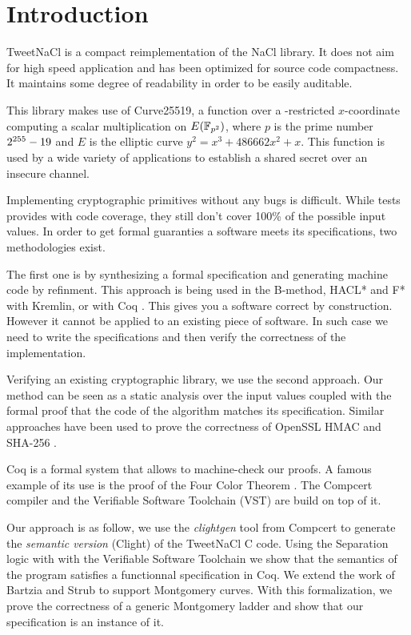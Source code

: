 \section{Introduction}

TweetNaCl\cite{BGJ+15} is a compact reimplementation of the
NaCl\cite{BLS12} library. It does not aim for high speed
application and has been optimized for source code compactness.
It maintains some degree of readability in order to be easily auditable.

This library makes use of Curve25519\cite{Ber06}, a function over a -restricted
$x$-coordinate computing a scalar multiplication on $E(\mathbb{F}_{p^2})$, where $p$ is
the prime number $2^{255}-19$ and $E$ is the elliptic curve $y^2 = x^3 + 486662 x^2 + x$.
This function is used by a wide variety of applications \cite{this-that-use-curve25519}
to establish a shared secret over an insecure channel.

Implementing cryptographic primitives without any bugs is difficult.
While tests provides with code coverage,
they still don't cover 100\% of the possible input values.
In order to get formal guaranties a software meets its specifications,
two methodologies exist.

The first one is by synthesizing a formal specification and
generating machine code by refinment. This approach is being used in the
B-method\cite{Abrial:1996:BAP:236705}, HACL*\cite{zinzindohoue2017hacl} and F* \cite{DBLP:journals/corr/BhargavanDFHPRR17}
with Kremlin, or with Coq \cite{CpdtJFR}.
This gives you a software correct by construction. However it cannot be applied
to an existing piece of software. In such case we need to write the specifications
and then verify the correctness of the implementation.

Verifying an existing cryptographic library, we use the second approach.
Our method can be seen as a static analysis over the input values coupled
with the formal proof that the code of the algorithm matches its specification.
Similar approaches have been used to prove the correctness of OpenSSL HMAC
\cite{Beringer2015VerifiedCA} and SHA-256 \cite{2015-Appel}.

Coq is a formal system that allows to machine-check our proofs.
A famous example of its use is the proof of the Four Color Theorem \cite{gonthier2008formal}.
The Compcert\cite{Leroy-backend} compiler and the Verifiable Software Toolchain
(VST)\cite{2012-Appel} are build on top of it.

Our approach is as follow, we use the \textit{clightgen} tool from Compcert to
generate the \textit{semantic version} (Clight\cite{Blazy-Leroy-Clight-09}) of
the TweetNaCl C code.
Using the Separation logic\cite{1969-Hoare,Reynolds02separationlogic}
with with the Verifiable Software Toolchain we show that the semantics of the
program satisfies a functionnal specification in Coq.
We extend the work of Bartzia and Strub \cite{DBLP:conf/itp/BartziaS14} to
support Montgomery curves.
With this formalization, we prove the correctness of a generic Montgomery ladder
and show that our specification is an instance of it.

